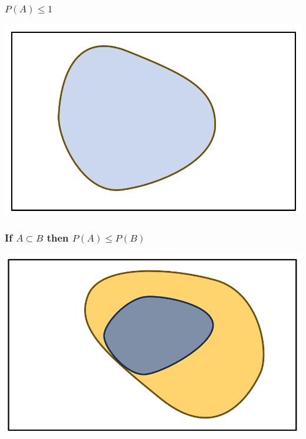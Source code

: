 \documentclass[compress]{beamer}
\begin{document}
\begin{frame}\frametitle{  $P(A)\leq 1$}
\begin{center}
\includegraphics[scale=.4]{figs/PALess1.png} 
\end{center}
\vspace{1in}
\end{frame}



\begin{frame}\frametitle{ If $A\subset B $ then $P(A)\leq P(B) $}
\begin{center}
\includegraphics[scale=.4]{figs/PALessPB.png} 
\end{center}
\vspace{1in}
\end{frame}
\end{document}
